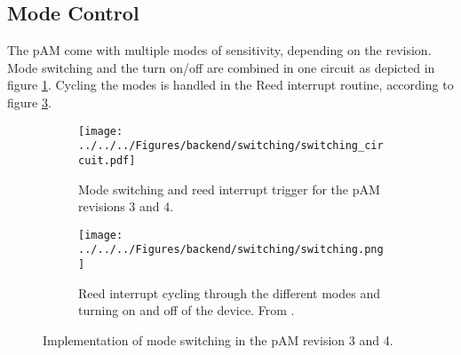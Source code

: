 \subsection{Mode Control}
The \ac{pAM} come with multiple modes of sensitivity, depending on the revision. Mode switching and the turn on/off are combined in one circuit as depicted in figure \ref{fig:backend:modeswitching:circuit}. Cycling the modes is handled in the Reed interrupt routine, according to figure \ref{fig:backend:modeswitching}. %
\begin{figure}
	\begin{subfigure}{0.49\textwidth}
		\centering
		\texttt{[image: ../../../Figures/backend/switching/switching\_circuit.pdf]}
		\caption{Mode switching and reed interrupt trigger for the \ac{pAM} revisions 3 and 4.}
		\label{fig:backend:modeswitching:circuit}
	\end{subfigure}\hfill
	\begin{subfigure}{0.49\textwidth}
		\centering
		\texttt{[image: ../../../Figures/backend/switching/switching.png]}
		\caption{Reed interrupt cycling through the different modes and turning on and off of the device. From \cite{roedel}.}
		\label{fig:backend:modeswitching}
	\end{subfigure}
\caption{Implementation of mode switching in the \ac{pAM} revision 3 and 4.}
\end{figure}

